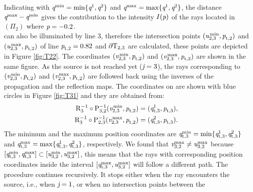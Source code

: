 Indicating with $\textit{q}^{\textrm{min}} = \min\{\textit{q}^{1}, \textit{q}^2\}$ and $\textit{q}^{\textrm{max}} = \max\{\textit{q}^{1}, \textit{q}^2\}$, the distance $\textit{q}^{\textrm{max}}-\textit{q}^{\textrm{min}}$ gives the contribution to the intensity $I(\textit{p})$ of the rays located in $(\Pi_2)$ where $\textit{p}=-0.2$.\\
\indent  {} can also be illuminated by line $3$, therefore the intersection points $(\textit{u}_{2, 3}^\textrm{\,min}, \textit{p}_{\textrm{t,} \textit{$2$}})$ and $(\textit{u}_{2, 3}^\textrm{\,max}, \textit{p}_{\textrm{t,} \textit{$2$}})$ of line
 $\textit{p}_{\textrm{t,} \textit{$2$}}=0.82$ and $\partial \mbox{$\textup{T}_{\textit{$2$,$3$}}$}$ are calculated, these points are depicted in Figure \ref{fig:T22}.
 The coordinates $(\textit{v}_{2, 3}^\textrm{\,min}, \textit{p}_{\textrm{t,} \textit{$2$}})$ and $(\textit{v}_{2, 3}^\textrm{\,max}, \textit{p}_{\textrm{t,} \textit{$2$}})$ are shown in the same figure.
 As the source is not reached yet ($\textit{j}=3$), the rays corresponding to $(\textit{v}_{2, 3}^\textrm{\,min}, \textit{p}_{\textrm{t,} \textit{$2$}})$ and $(\textit{v}_{2, 3}^\textrm{\,max}, \textit{p}_{\textrm{t,} \textit{$2$}})$ are followed back using the inverses of the propagation and the reflection maps. The coordinates on  are shown  with blue circles in Figure \ref{fig:T31} and they are obtained from:
 \begin{equation}
\begin{split}
\mathrm{R}_{{3}}^{-1}\circ \mathrm{P}_{{3,2}}^{-1}(\textit{v}_{2, 3}^\textrm{\,min}, \textit{p}_{\textrm{t,} \textit{$2$}}) &= (\textit{q}_{\textrm{t,} \textit{$3$}}^{1}, \textit{p}_{\textrm{t,} \textit{$3$}}),\\
\mathrm{R}_{{3}}^{-1}\circ \mathrm{P}_{{2,3}}^{-1}(\textit{v}_{2, 3}^\textrm{\,max}, \textit{p}_{\textrm{t,} \textit{$2$}}) &= (\textit{q}_{\textrm{t,} \textit{$3$}}^{2}, \textit{p}_{\textrm{t,} \textit{$3$}}).
\end{split}
\end{equation}
The minimum and the maximum position coordinates are $\textit{q}_{\textrm{t,} \textit{$3$}}^{\textrm{min}}= \min\{\textit{q}_{\textrm{t,} \textit{$3$}}^{1}, \textit{q}_{\textrm{t,} \textit{$3$}}^{2}\}$ and 
$\textit{q}_{\textrm{t,} \textit{$3$}}^{\textrm{max}}= \max\{\textit{q}_{\textrm{t,} \textit{$3$}}^{1}, \textit{q}_{\textrm{t,} \textit{$3$}}^{2}\}$, respectively.
We found that $\textit{v}_{3,2}^\textrm{max}\neq\textit{u}_{3,2}^\textrm{max}$ because $[\textit{q}_{\textrm{t,} \textit{$3$}}^\textrm{min}, \textit{q}_{\textrm{t,} \textit{$3$}}^\textrm{max}]\subset
[\textit{u}_{3,2}^\textrm{min},\textit{u}_{3,2}^\textrm{max}]$, this means that the rays with corresponding position coordinates inside the interval 
$[\textit{q}_{\textrm{t,} \textit{$3$}}^\textrm{max},\textit{u}_{3,2}^\textrm{max}]$ will follow a different path. 
The procedure continues recursively.
  It stops either when the ray encounters the source, i.e., when $\textit{j}=1$, or when no intersection points between the

